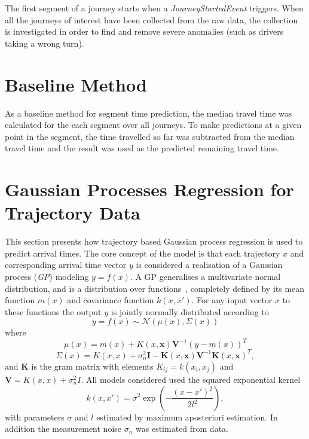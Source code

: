 The first segment of a journey starts when a \textit{JourneyStartedEvent} triggers. When all the journeys of interest have been collected from the raw data, the collection is investigated in order to find and remove severe anomalies (such as drivers taking a wrong turn). 

\section{Baseline Method}
As a baseline method for segment time prediction, the median travel time was calculated for the each segment over all journeys. To make predictions at a given point in the segment, the time travelled so far was subtracted from the median travel time and the result was used as the predicted remaining travel time.

\section{Gaussian Processes Regression for Trajectory Data}
This section presents how trajectory based Gaussian process regression
is used to predict arrival times. The core concept of the model is that each
trajectory $x$ and corresponding arrival time vector $y$ is
considered a realisation of a Gaussian process (\textit{GP}) modeling $y =
f(x)$. A GP generalises a multivariate
normal distribution, and is a distribution over
functions~\cite{Rasmussen-Williams-2006}, completely defined by its
mean function $m(x)$ and covariance function $k(x, x')$. For any input
vector $x$ to these functions the output $y$ is jointly normally distributed according to
\begin{equation}
  \label{eq:gp}
  y = f(x) \sim \mathcal{N}(\mu(x), \Sigma(x))
\end{equation}
where
\begin{equation}
  \label{eq:gp-mean-function}
  \mu(x) = m(x) + K(x, \textbf{x})\textbf{V}^{-1}{(y-m(x))}^{T}
\end{equation}
\begin{equation}
  \label{eq:gp-covariance-function}
  \Sigma(x) = K(x, x) + \sigma^{2}_n\textbf{I} - \textbf{K}(x, \textbf{x})\textbf{V}^{-1}{\textbf{K}(x, \textbf{x})}^{T},
\end{equation}
and $\textbf{K}$ is the gram matrix with elements $K_{ij} = k(x_i, x_j)$ and $\textbf{V}
= K(x, x) + \sigma_n^2I$. All models considered used the squared
exponential kernel
\begin{equation}
  k(x, x') = \sigma^2\exp(-\frac{(x-x')^{2}}{2l^2}),
\end{equation}
with parameters $\sigma$ and $l$ estimated by maximum aposteriori
estimation. In addition the measurement noise $\sigma_n$ was estimated
from data.

